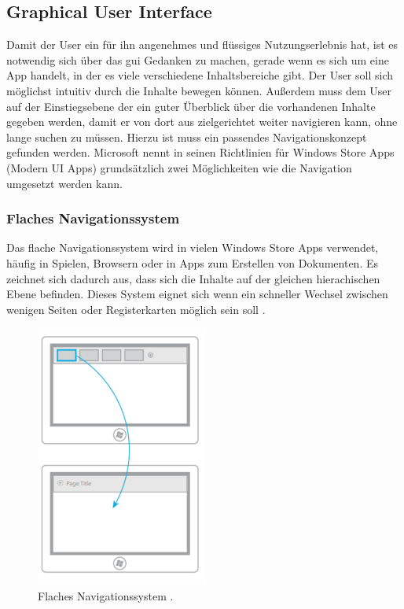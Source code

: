 \documentclass[12pt,a4paper,bibtotoc,abstracton]{scrartcl}
\begin{document}
\subsection{Graphical User Interface}
\label{subsec:gui}
Damit der User ein für ihn angenehmes und flüssiges Nutzungserlebnis hat, ist es notwendig sich über das \ac{gui} Gedanken zu machen, gerade wenn es sich um eine App handelt, in der es viele verschiedene Inhaltsbereiche gibt. Der User soll sich möglichst intuitiv durch die Inhalte bewegen können. Außerdem muss dem User auf der Einstiegsebene der ein guter Überblick über die vorhandenen Inhalte gegeben werden, damit er von dort aus zielgerichtet weiter navigieren kann, ohne lange suchen zu müssen. Hierzu ist muss ein passendes Navigationskonzept gefunden werden.  Microsoft nennt in seinen Richtlinien für Windows Store Apps (Modern UI Apps) grundsätzlich zwei Möglichkeiten wie die Navigation umgesetzt werden kann.

\subsubsection{Flaches Navigationssystem}
\label{subsubsec:flachessystem}
Das flache Navigationssystem wird in vielen Windows Store Apps verwendet, häufig in Spielen, Browsern oder in Apps zum Erstellen von Dokumenten. Es zeichnet sich dadurch aus, dass sich die Inhalte auf der gleichen hierachischen Ebene befinden. Dieses System eignet sich wenn ein schneller Wechsel zwischen wenigen Seiten oder Registerkarten möglich sein soll \citep{MicrosoftNavidesign2013}.

\begin{figure}[h]	
	\centering
	\includegraphics[scale=1]{Bilder/Abbildungen/ms_navigation_flach.png} 
	\caption{Flaches Navigationssystem \protect\citep{MicrosoftNavidesign2013}.}
	\label{fig:naviflach}
\end{figure}
\end{document}
